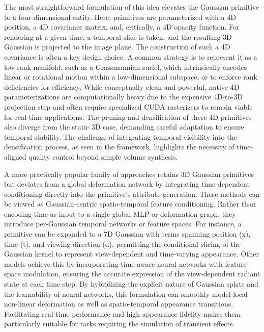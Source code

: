 \documentclass[11pt,a4paper]{article}
\begin{document}
The most straightforward formulation of this idea elevates the Gaussian primitive to a four-dimensional entity. Here, primitives are parameterized with a 4D position, a 4D covariance matrix, and, critically, a 4D opacity function. For rendering at a given time, a temporal slice is taken, and the resulting 3D Gaussian is projected to the image plane. The construction of such a 4D covariance is often a key design choice. A common strategy is to represent it as a low-rank manifold, such as a Grassmannian surfel, which intrinsically encodes linear or rotational motion within a low-dimensional subspace, or to enforce rank deficiencies for efficiency. While conceptually clean and powerful, native 4D parameterizations are computationally heavy due to the expensive 4D-to-3D projection step and often require specialized CUDA rasterizers to remain viable for real-time applications. The pruning and densification of these 4D primitives also diverge from the static 3D case, demanding careful adaptation to ensure temporal stability. The challenge of integrating temporal visibility into the densification process, as seen in the \cite{arxiv:2606.23212v1} framework, highlights the necessity of time-aligned quality control beyond simple volume synthesis.

A more practically popular family of approaches retains 3D Gaussian primitives but deviates from a global deformation network by integrating time-dependent conditioning directly into the primitive's attribute generation. These methods can be viewed as Gaussian-centric spatio-temporal feature conditioning. Rather than encoding time as input to a single global MLP or deformation graph, they introduce per-Gaussian temporal networks or feature spaces. For instance, a primitive can be expanded to a 7D Gaussian with terms spanning position (x), time (t), and viewing direction (d), permitting the conditional slicing of the Gaussian kernel to represent view-dependent and time-varying appearance. Other models achieve this by incorporating time-aware neural networks with feature-space modulation, ensuring the accurate expression of the view-dependent radiant state at each time step. By hybridizing the explicit nature of Gaussian splats and the learnability of neural networks, this formulation can smoothly model local non-linear deformation as well as spatio-temporal appearance transitions. Facilitating real-time performance and high appearance fidelity makes them particularly suitable for tasks requiring the simulation of transient effects.
\end{document}
